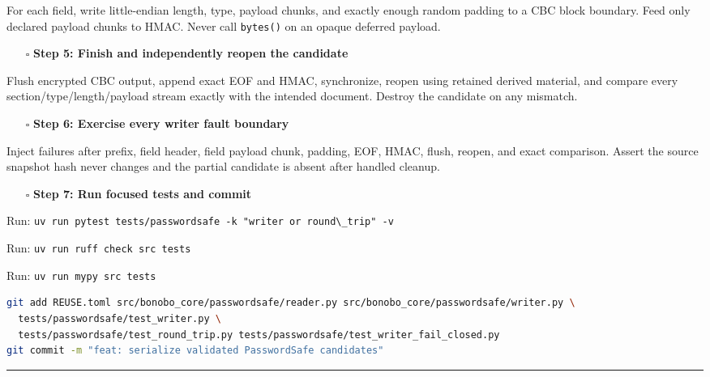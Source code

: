 \documentclass[
  letterpaper,
]{article}
\newcommand{\passthrough}[1]{#1}
\providecommand{\tightlist}{%
  \setlength{\itemsep}{0pt}\setlength{\parskip}{0pt}}
\begin{document}
For each field, write little-endian length, type, payload chunks, and exactly enough random padding to a CBC block
boundary. Feed only declared payload chunks to HMAC. Never call \passthrough{\lstinline!bytes()!} on an opaque deferred
payload.

\begin{itemize}
\tightlist
\item[$\square$]
  \textbf{Step 5: Finish and independently reopen the candidate}
\end{itemize}

Flush encrypted CBC output, append exact EOF and HMAC, synchronize, reopen using retained derived material, and compare
every section/type/length/payload stream exactly with the intended document. Destroy the candidate on any mismatch.

\begin{itemize}
\tightlist
\item[$\square$]
  \textbf{Step 6: Exercise every writer fault boundary}
\end{itemize}

Inject failures after prefix, field header, field payload chunk, padding, EOF, HMAC, flush, reopen, and exact
comparison. Assert the source snapshot hash never changes and the partial candidate is absent after handled cleanup.

\begin{itemize}
\tightlist
\item[$\square$]
  \textbf{Step 7: Run focused tests and commit}
\end{itemize}

Run: \passthrough{\lstinline!uv run pytest tests/passwordsafe -k "writer or round\_trip" -v!}

Run: \passthrough{\lstinline!uv run ruff check src tests!}

Run: \passthrough{\lstinline!uv run mypy src tests!}

\begin{lstlisting}[language=bash]
git add REUSE.toml src/bonobo_core/passwordsafe/reader.py src/bonobo_core/passwordsafe/writer.py \
  tests/passwordsafe/test_writer.py \
  tests/passwordsafe/test_round_trip.py tests/passwordsafe/test_writer_fail_closed.py
git commit -m "feat: serialize validated PasswordSafe candidates"
\end{lstlisting}

\begin{center}\rule{0.5\linewidth}{0.5pt}\end{center}
\end{document}
